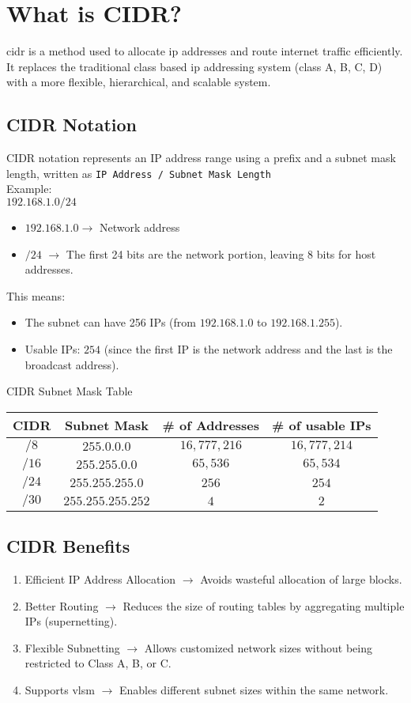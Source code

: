 \documentclass[../main.tex]{subfiles}
\begin{document}
\section{What is CIDR?}
\acrfull{cidr} is a method used to allocate \acrshort{ip} addresses and route internet traffic efficiently. 
It replaces the traditional class based \acrshort{ip} addressing system (class A, B, C, D) with a more flexible, hierarchical, and scalable system.
\subsection{CIDR Notation}
CIDR notation represents an IP address range using a prefix and a subnet mask length, written as \lstinline{IP Address / Subnet Mask Length}
\\
Example:
\\
$192.168.1.0/24$
\begin{itemize}
  \item $192.168.1.0 \rightarrow$ Network address
  \item $/24$ $\rightarrow$ The first 24 bits are the network portion, leaving 8 bits for host addresses.
\end{itemize}
This means:
\begin{itemize}
  \item The subnet can have 256 IPs (from $192.168.1.0$ to $192.168.1.255$).
  \item Usable IPs: $254$ (since the first IP is the network address and the last is the broadcast address).
\end{itemize}

CIDR Subnet Mask Table
\begin{center}
  \begin{tabular}{ ||c|c|c|c|| }
    \hline
    CIDR & Subnet Mask & \# of Addresses & \# of usable IPs \\ [0.5ex]
    \hline \hline
    $/8$ & $255.0.0.0$ & $16,777,216$ & $16,777,214$ \\
    \hline
    $/16$ & $255.255.0.0$ & $65,536$ & $65,534$ \\
    \hline
    $/24$ & $255.255.255.0$ & $256$ & $254$ \\
    \hline
    $/30$ & $255.255.255.252$ & $4$ & $2$ \\
    \hline
  \end{tabular}
\end{center}
\subsection{CIDR Benefits}
\begin{enumerate}
  \item Efficient IP Address Allocation $\rightarrow$ Avoids wasteful allocation of large blocks.
  \item Better Routing $\rightarrow$ Reduces the size of routing tables by aggregating multiple IPs (supernetting).
  \item Flexible Subnetting $\rightarrow$ Allows customized network sizes without being restricted to Class A, B, or C.
  \item Supports \acrfull{vlsm} $\rightarrow$ Enables different subnet sizes within the same network.
\end{enumerate}
\end{document}
